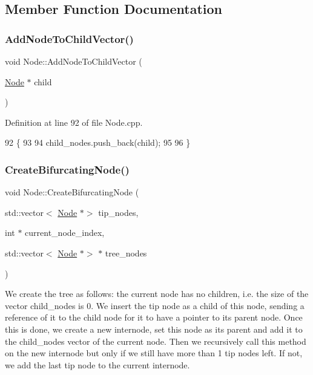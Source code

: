 \subsection{Member Function Documentation}
\mbox{\label{classNode_aef73af92aa3046218f83ed67a7996188}} 
\subsubsection{\texorpdfstring{Add\+Node\+To\+Child\+Vector()}{AddNodeToChildVector()}}
{\footnotesize\ttfamily void Node\+::\+Add\+Node\+To\+Child\+Vector (\begin{DoxyParamCaption}\item[{\hyperlink{classNode}{Node} $\ast$}]{child }\end{DoxyParamCaption})}



Definition at line 92 of file Node.\+cpp.


\begin{DoxyCode}
92                                           \{
93   
94   child\_nodes.push\_back(child);
95   
96 \}
\end{DoxyCode}
\mbox{\label{classNode_a188e5d00d54887dc3490837f2f025abf}} 
\subsubsection{\texorpdfstring{Create\+Bifurcating\+Node()}{CreateBifurcatingNode()}}
{\footnotesize\ttfamily void Node\+::\+Create\+Bifurcating\+Node (\begin{DoxyParamCaption}\item[{std\+::vector$<$ \hyperlink{classNode}{Node} $\ast$$>$}]{tip\+\_\+nodes,  }\item[{int $\ast$}]{current\+\_\+node\+\_\+index,  }\item[{std\+::vector$<$ \hyperlink{classNode}{Node} $\ast$$>$ $\ast$}]{tree\+\_\+nodes }\end{DoxyParamCaption})}

We create the tree as follows\+: the current node has no children, i.\+e. the size of the vector child\+\_\+nodes is 0. We insert the tip node as a child of this node, sending a reference of it to the child node for it to have a pointer to its parent node. Once this is done, we create a new internode, set this node as its parent and add it to the child\+\_\+nodes vector of the current node. Then we recursively call this method on the new internode but only if we still have more than 1 tip nodes left. If not, we add the last tip node to the current internode.

